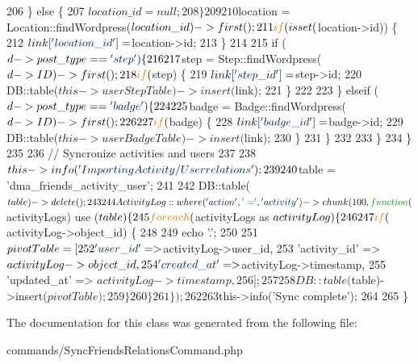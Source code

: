 \begin{DoxyCode}
206                 \} \textcolor{keywordflow}{else} \{
207                     $location\_id = null;
208                 \}
209 
210                 $location = Location::findWordpress($location\_id)->first();
211                 \textcolor{keywordflow}{if} (isset($location->id)) \{
212                     $link[\textcolor{stringliteral}{'location\_id'}] = $location->id;
213                 \}
214 
215                 \textcolor{keywordflow}{if} ($d->post\_type == \textcolor{stringliteral}{'step'}) \{
216 
217                     $step = Step::findWordpress($d->ID)->first();
218                     \textcolor{keywordflow}{if} ($step) \{
219                         $link[\textcolor{stringliteral}{'step\_id'}] = $step->id;
220                         DB::table($this->userStepTable)->insert($link);
221                     \}
222 
223                 \} elseif ($d->post\_type == \textcolor{stringliteral}{'badge'}) \{
224 
225                     $badge = Badge::findWordpress($d->ID)->first();
226 
227                     \textcolor{keywordflow}{if} ($badge) \{
228                         $link[\textcolor{stringliteral}{'badge\_id'}] = $badge->id;
229                         DB::table($this->userBadgeTable)->insert($link);
230                     \}
231                 \}
232 
233             \}
234         \}
235 
236         \textcolor{comment}{// Syncronize activities and users}
237 
238         $this->info(\textcolor{stringliteral}{'Importing Activity/User relations'});
239         
240         $table = \textcolor{stringliteral}{'dma\_friends\_activity\_user'};
241 
242         DB::table($table)->delete();
243 
244         ActivityLog::where(\textcolor{stringliteral}{'action'}, \textcolor{charliteral}{'='}, \textcolor{stringliteral}{'activity'})->chunk(100, \textcolor{keyword}{function}($activityLogs) use ($table) \{
245             \textcolor{keywordflow}{foreach} ($activityLogs as $activityLog) \{
246 
247                 \textcolor{keywordflow}{if} ($activityLog->object\_id) \{
248 
249                     echo \textcolor{stringliteral}{'.'};
250 
251                     $pivotTable = [
252                         \textcolor{stringliteral}{'user\_id'}       => $activityLog->user\_id,
253                         \textcolor{stringliteral}{'activity\_id'}   => $activityLog->object\_id,
254                         \textcolor{stringliteral}{'created\_at'}    => $activityLog->timestamp,
255                         \textcolor{stringliteral}{'updated\_at'}    => $activityLog->timestamp,
256                     ];
257 
258                     DB::table($table)->insert($pivotTable);
259                 \}
260             \}
261         \});
262 
263         $this->info(\textcolor{stringliteral}{'Sync complete'});
264 
265     \}
\end{DoxyCode}


The documentation for this class was generated from the following file\+:\begin{DoxyCompactItemize}
\item 
commands/Sync\+Friends\+Relations\+Command.\+php\end{DoxyCompactItemize}
